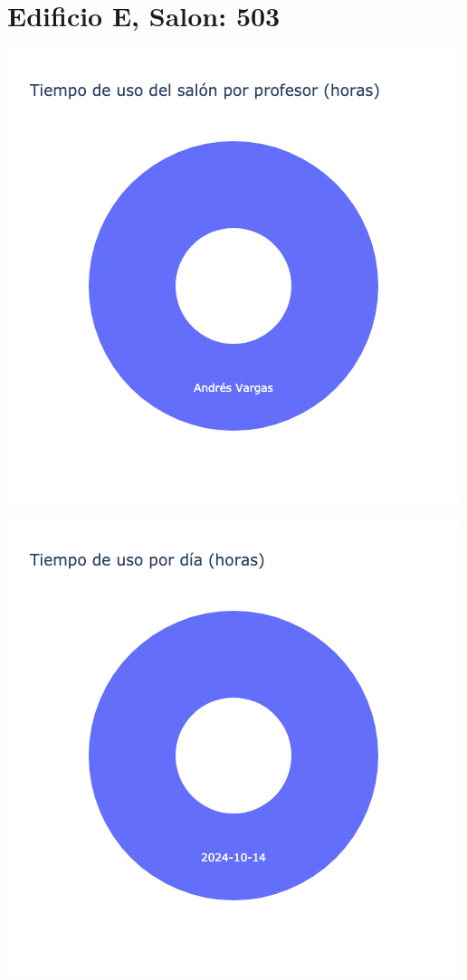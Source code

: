 \documentclass{article}
\begin{document}
    \section{Edificio E, Salon: 503}
    \noindent
    \begin{minipage}{0.48\textwidth}
        \centering
        \includegraphics[width=\textwidth]{../img/pie/UP503-90Dias-03-12-2024.png}
    \end{minipage}
    \hfill
    \begin{minipage}{0.48\textwidth}
        \centering
        \includegraphics[width=\textwidth]{../img/pie/UD503-90Dias-03-12-2024.png}
    \end{minipage}
    
\end{document}
